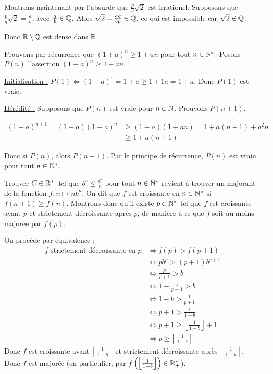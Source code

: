 \documentclass[]{../templates/homework}
\providecommand{\floor}[1]{\left \lfloor #1 \right \rfloor }
\begin{document}
Montrons maintenant par l'absurde que $\frac p q \sqrt 2$ est irrationel. Supposons que $\frac p q \sqrt 2 = \frac a b$, avec $\frac a b \in \mathbb Q$. Alors $\sqrt 2 = \frac {aq} {bp} \in \mathbb Q$, ce qui est impossible car $\sqrt 2 \not \in \mathbb Q$.

Donc $\mathbb R \setminus \mathbb Q$ est dense dans $\mathbb R$.

\subproblem
\question Prouvons par récurrence que $(1+a)^n \geq 1+an$ pour tout $n \in \mathbb N^*$. Posons $P(n)$ l'assertion $(1+a)^n\geq 1+an$.

\underline{Initialisation :} $P(1) \iff (1+a)^1 = 1+a \geq 1+ 1a = 1+a$. Donc $P(1)$ est vraie.

\underline{Hérédité :} Supposons que $P(n)$ est vraie pour $n\in\mathbb N$. Prouvons $P(n+1)$.

\begin{align*}
	(1+a)^{n+1} = (1+a)(1+a)^n & \geq (1+a)(1+an) = 1 + a(n+1) + a^2n \\
	& \geq 1 + a(n+1)
\end{align*}

Donc si $P(n)$, alors $P(n+1)$. Par le principe de récurrence, $P(n)$ est vraie pour tout $n\in\mathbb N^*$.

\question Trouver $C\in\mathbb R_+^*$ tel que $b^n \leq \frac C n$ pour tout $n\in\mathbb N^*$ revient à trouver un majorant de la fonction $f : n\mapsto nb^n$. On dit que $f$ est croissante en $n \in \mathbb N^*$ si $f(n+1) \geq f(n)$. Montrons donc qu'il existe $p\in\mathbb N^*$ tel que $f$ est croissante avant $p$ et strictement décroissante après $p$, de manière à ce que $f$ soit au moins majorée par $f(p)$.

On procède par équivalence :
\begin{align*}
	f \text{ strictement décroissante en } p & \iff f(p) > f(p+1) \\
		& \iff pb^p > (p+1)b^{p+1} \\
		& \iff \frac p {p+1} > b \\
		& \iff 1 - \frac 1 {p+1} > b \\
		& \iff 1 - b > \frac 1 {p+1} \\
		& \iff p +1 > \frac 1 {1-b} \\
		& \iff p + 1 \geq \floor {\frac 1 {1-b}} + 1 \\
		& \iff p \geq \floor {\frac 1 {1-b}}
\end{align*}
Donc $f$ est croissante avant $\floor {\frac 1 {1-b}}$ et strictement décroissante après $\floor {\frac 1 {1-b}}$. Donc $f$ est majorée (en particulier, par $f\left(\floor {\frac 1 {1-b}}\right ) \in \R_+^*$).
\end{document}
